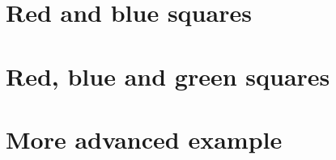 \documentclass{article}
\begin{document}
\section{Red and blue squares}



\section{Red, blue and green squares}



\section{More advanced example}


\end{document}
